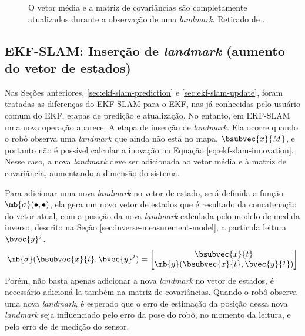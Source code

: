 \begin{figure}[h]
  \centering
  
  \caption{O vetor média e a matriz de covariâncias são completamente atualizados durante a observação de uma \textit{landmark}. Retirado de \cite[p.~8]{jsola}.}
  \label{fig:ekf-slam-update}
\end{figure}

\subsection{EKF-SLAM: Inserção de \textit{landmark} (aumento do vetor de estados)}
Nas Seções anteriores, \ref{sec:ekf-slam-prediction} e \ref{sec:ekf-slam-update}, foram tratadas as diferenças 
do EKF-SLAM para o EKF, nas já conhecidas pelo usuário comum do EKF, etapas de predição e atualização. No entanto, em EKF-SLAM uma nova operação aparece: A etapa de inserção de \textit{landmark}. Ela ocorre quando o robô observa uma \textit{landmark} que ainda não está no mapa, $\bsubvec{x}{M}$, e portanto não é possível calcular a inovação na Equação \ref{eq:ekf-slam-innovation}. Nesse caso, a nova \textit{landmark} deve ser adicionada ao vetor média e à matriz de covariância, aumentando a dimensão do sistema.

Para adicionar uma nova \textit{landmark} no vetor de estado, será definida 
a função $\mb{\sigma}(\bullet, \bullet)$, ela gera um novo vetor de estados 
que é resultado da concatenação do vetor atual, com a posição da nova 
\textit{landmark} calculada pelo modelo de medida inverso, descrito na Seção \ref{sec:inverse-measurement-model}, a partir da leitura $\bvec{y}^j$.
\begin{equation}
      \mb{\sigma}(\bsubvec{x}{t}, \bvec{y}^j) = \begin{bmatrix}
        \bsubvec{x}{t} \\
        \mb{g}(\bsubvec{x}{t}, \bvec{y}{^j})
      \end{bmatrix}
\end{equation}
Porém, não basta apenas adicionar a nova \textit{landmark} no vetor de estados, é necessário adicioná-la também na matriz de covariâncias. Quando 
o robô observa uma nova \textit{landmark}, é esperado que o erro de estimação 
da posição dessa nova \textit{landmark} seja influenciado pelo erro da 
pose do robô, no momento da leitura, e pelo erro de de medição do sensor. 

